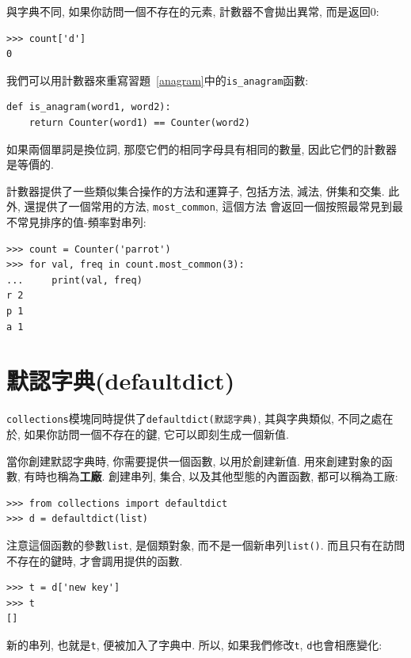 \documentclass[10pt]{book}
\begin{document}
與字典不同, 如果你訪問一個不存在的元素, 計數器不會拋出異常, 而是返回0:

\begin{verbatim}
>>> count['d']
0
\end{verbatim}

我們可以用計數器來重寫習題~\ref{anagram}中的\verb"is_anagram"函數:

\begin{verbatim}
def is_anagram(word1, word2):
    return Counter(word1) == Counter(word2)
\end{verbatim}

如果兩個單詞是換位詞, 那麼它們的相同字母具有相同的數量, 因此它們的計數器是等價的. 

計數器提供了一些類似集合操作的方法和運算子, 
包括方法, 減法, 併集和交集. 
此外, 還提供了一個常用的方法, \verb"most_common", 這個方法
會返回一個按照最常見到最不常見排序的值-頻率對串列:

\begin{verbatim}
>>> count = Counter('parrot')
>>> for val, freq in count.most_common(3):
...     print(val, freq)
r 2
p 1
a 1
\end{verbatim}

\section{默認字典(defaultdict)}

{\tt collections}模塊同時提供了{\tt defaultdict(默認字典)}, 
其與字典類似, 不同之處在於, 如果你訪問一個不存在的鍵, 它可以即刻生成一個新值. 

當你創建默認字典時, 你需要提供一個函數, 以用於創建新值. 
用來創建對象的函數, 有時也稱為{\bf 工廠}.
創建串列, 集合, 以及其他型態的內置函數, 都可以稱為工廠:

\begin{verbatim}
>>> from collections import defaultdict
>>> d = defaultdict(list)
\end{verbatim}

注意這個函數的參數{\tt list}, 是個類對象, 
而不是一個新串列{\tt list()}. 
而且只有在訪問不存在的鍵時, 才會調用提供的函數.

\begin{verbatim}
>>> t = d['new key']
>>> t
[]
\end{verbatim}

新的串列, 也就是{\tt t}, 便被加入了字典中. 
所以, 如果我們修改{\tt t}, {\tt d}也會相應變化:
\end{document}

